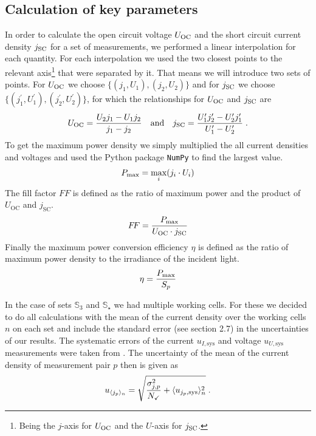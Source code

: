 \documentclass[a4paper,10pt,twocolumn]{article}
\begin{document}
\begin{extract*}
\subsection{Calculation of key parameters}\label{subsec:calckeyparams}
In order to calculate the open circuit voltage $U_{\text{OC}}$ and the short circuit current density $j_{\text{SC}}$ for a set of measurements, we performed a linear interpolation for each quantity. For each interpolation we used the two closest points to the relevant axis\footnote{Being the $j$-axis for $U_{\text{OC}}$ and the $U$-axis for $j_{\text{SC}}$.} that were separated by it.\mypar
That means we will introduce two sets of points. For $U_{\text{OC}}$ we choose $\{(j_1,U_1),(j_2,U_2)\}$ and for $j_{\text{SC}}$ we choose $\{(j_1^\prime,U_1^\prime),(j_2^\prime,U_2^\prime)\}$, for which the relationships for $U_{\text{OC}}$ and $j_{\text{SC}}$ are 
\begin{align}\label{eq:interpol}
	U_{\text{OC}} = \frac{U_2 j_1 - U_1 j_2}{j_1-j_2}\quad\text{and}\quad j_{\text{SC}} = \frac{U_1^\prime j_2^\prime - U_2^\prime j_1^\prime}{U_1^\prime-U_2^\prime}\;.
\end{align}
To get the maximum power density we simply multiplied the all current densities and voltages and used the Python package \texttt{NumPy} to find the largest value.
\begin{align}
	P_{\text{max}} = \max_{i} (j_i\cdot U_i)
\end{align}
The fill factor $F\!F$ is defined as the ratio of maximum power and the product of $U_{\mathrm{OC}}$ and $j_{\mathrm{SC}}$.
\begin{align}
	F\!F = \frac{P_{\text{max}}}{U_{\text{OC}} \cdot j_{\text{SC}}}
\end{align}
Finally the maximum power conversion efficiency $\eta$ is defined as the ratio of maximum power density to the irradiance of the incident light.
\begin{align}
	\eta = \frac{P_{\text{max}}}{S_p}
\end{align}

In the case of sets $\mathbb{S}_3$ and $\mathbb{S}_\star$ we had multiple working cells. For these we decided to do all calculations with the mean of the current density over the working cells $n$ on each set and include the standard error (see \cite{measurements} section 2.7) in the uncertainties of our results. The systematic errors of the current $u_{I,\text{sys}}$ and voltage $u_{U,\text{sys}}$ measurements were taken from \cite{keithley}. The uncertainty of the mean of the current density of measurement pair $p$ then is given as
\begin{equation}\label{eq:jerr}
	u_{\langle j_p \rangle_n} = \sqrt{\frac{\sigma_{j,p}^2}{N_\checkmark} + \langle u_{j_p,\text{sys}} \rangle_n^2} \;.
\end{equation}


\end{extract*}
\end{document}
